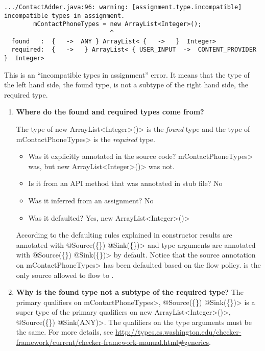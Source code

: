\begin{Verbatim}  
.../ContactAdder.java:96: warning: [assignment.type.incompatible] incompatible types in assignment.
        mContactPhoneTypes = new ArrayList<Integer>();
                             ^
  found   :  {   ->  ANY } ArrayList< {   ->   }  Integer>
  required:  {   ->   } ArrayList< { USER_INPUT  ->  CONTENT_PROVIDER }  Integer>
\end{Verbatim}
This is an ``incompatible types in assignment'' error.  It means that the type
of the left hand side, the found type, is not a subtype of the right hand side,
the required type.
 
\begin{enumerate}

\item \textbf{Where do the found  and required types come from?}

The type of \<new ArrayList\textless Integer\textgreater()> is the \emph{found} type and the type of \<mContactPhoneTypes> is
the \emph{required} type.  


 \begin{itemize}
    \item Was it explicitly annotated in the source code?  \<mContactPhoneTypes> was, but \<new ArrayList\textless Integer\textgreater()> was not.
    \item Is it from an API method that was annotated in stub file? No
    \item Was it inferred from an assignment? No
    \item Was it defaulted? Yes, \<new ArrayList\textless Integer\textgreater()> 
    \end{itemize}

 According to the defaulting rules explained in  constructor results
 are annotated with \<@Source(\{\}) @Sink(\{\})> and type arguments are annotated 
 with \<@Source(\{\}) @Sink(\{\})> by 
 default. Notice that the source annotation on \<mContactPhoneTypes> has been defaulted based on the 
 flow policy.   is the only source allowed to flow to . 

 \item\textbf{ Why is the found type not a subtype of the required type?}
The primary qualifiers on \<mContactPhoneTypes>, \<@Source(\{\}) @Sink(\{\})> 
is a super type of the primary qualifiers on \<new ArrayList\textless Integer\textgreater()>,
 \<@Source(\{\}) @Sink(ANY)>.  The qualifiers on the type arguments must be the same. 
For more details, see
\url{http://types.cs.washington.edu/checker-framework/current/checker-framework-manual.html#generics}.


\end{enumerate}
